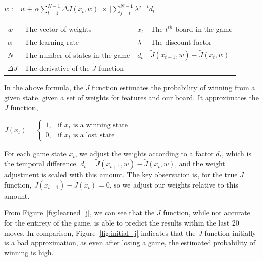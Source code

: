 \documentclass[11pt]{article}
\begin{document}
\begin{center}

    $\displaystyle w := w + \alpha \sum _{t=1} ^{N-1} \Delta \tilde{J}(x_t,w) \: \times \: \Big[ \sum ^ {N-1} _{j=t} \lambda^{j-t} d_t \Big] $\\
        
    \begin{tabular}{  l l | l l }
      $w$                   & The vector of weights                         &$x_t$  & The $t^{th}$ board in the game \\
      $\alpha$              & The learning rate                             &$\lambda$      &The discount factor \\
      $N$                   & The number of states in the game              &$d_t$          &$\tilde{J}(x_{t+1},w) - \tilde{J}(x_t,w)$\\
      $\Delta \tilde{J}$    & The derivative of the $\tilde{J}$ function    &               &\\
    \end{tabular}
\end{center}

In the above formula, the $\tilde{J}$ function estimates the probability of
winning from a given state, given a set of weights for features and our board.
It approximates the $J$ function, \\

\begin{center}
$
J(x_t) = \begin{cases} 1, & \mbox{if } x_t\mbox{ is a winning state} \\ 0, & \mbox{if } x_t\mbox{ is a lost state} \end{cases}
$
\end{center}

For each game state $x_t$, we adjust the weights according to a factor $d_t$,
which is the temporal difference. $d_t = \tilde{J}(x_{t+1},w) -
\tilde{J}(x_t,w)$, and the weight adjustment is scaled with this amount. The
key observation is, for the true $J$ function, $J(x_{t+1}) - J(x_t) = 0$, so
we adjust our weights relative to this amount.

From Figure~\ref{fig:learned_j}, we can see that the
$\tilde{J}$ function, while not accurate for the entirety of the game, is able
to predict the results within the last 20 moves. In comparison,
Figure~\ref{fig:initial_j} indicates that the $\tilde{J}$ function
initially is a bad approximation, as even after losing a game, the estimated
probability of winning is high.
\end{document}

